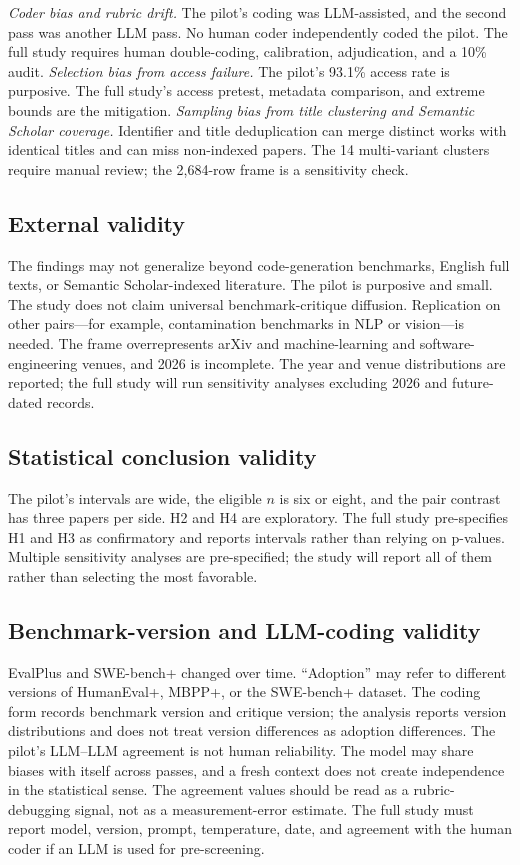 \documentclass[11pt,a4paper]{article}
\begin{document}
\emph{Coder bias and rubric drift.} The pilot's coding was LLM-assisted, and the second pass was another LLM pass. No human coder independently coded the pilot. The full study requires human double-coding, calibration, adjudication, and a 10\% audit. \emph{Selection bias from access failure.} The pilot's 93.1\% access rate is purposive. The full study's access pretest, metadata comparison, and extreme bounds are the mitigation. \emph{Sampling bias from title clustering and Semantic Scholar coverage.} Identifier and title deduplication can merge distinct works with identical titles and can miss non-indexed papers. The 14 multi-variant clusters require manual review; the 2,684-row frame is a sensitivity check.

\subsection{External validity}

The findings may not generalize beyond code-generation benchmarks, English full texts, or Semantic Scholar-indexed literature. The pilot is purposive and small. The study does not claim universal benchmark-critique diffusion. Replication on other pairs---for example, contamination benchmarks in NLP or vision---is needed. The frame overrepresents arXiv and machine-learning and software-engineering venues, and 2026 is incomplete. The year and venue distributions are reported; the full study will run sensitivity analyses excluding 2026 and future-dated records.

\subsection{Statistical conclusion validity}

The pilot's intervals are wide, the eligible $n$ is six or eight, and the pair contrast has three papers per side. H2 and H4 are exploratory. The full study pre-specifies H1 and H3 as confirmatory and reports intervals rather than relying on p-values. Multiple sensitivity analyses are pre-specified; the study will report all of them rather than selecting the most favorable.

\subsection{Benchmark-version and LLM-coding validity}

EvalPlus and SWE-bench+ changed over time. ``Adoption'' may refer to different versions of HumanEval+, MBPP+, or the SWE-bench+ dataset. The coding form records benchmark version and critique version; the analysis reports version distributions and does not treat version differences as adoption differences. The pilot's LLM--LLM agreement is not human reliability. The model may share biases with itself across passes, and a fresh context does not create independence in the statistical sense. The agreement values should be read as a rubric-debugging signal, not as a measurement-error estimate. The full study must report model, version, prompt, temperature, date, and agreement with the human coder if an LLM is used for pre-screening.
\end{document}

